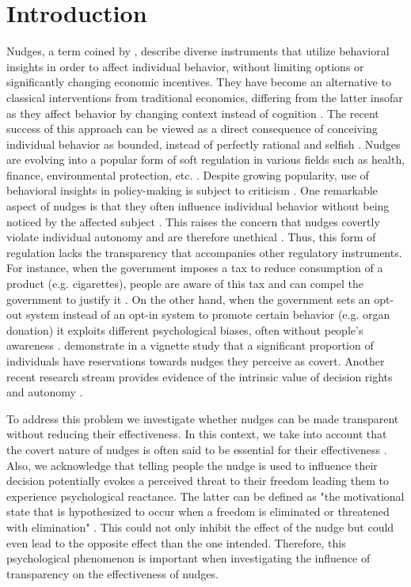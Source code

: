 \documentclass[review, authoryear,12pt]{elsarticle}
\begin{document}

\section{Introduction}
Nudges, a term coined by \cite{Thaler.2008}, describe diverse instruments that utilize behavioral insights in order to affect individual behavior, without limiting options or significantly changing economic incentives. They have become an alternative to classical interventions from traditional economics, differing from the latter insofar as they affect behavior by changing context instead of cognition \citep{Dolan.2012}. The recent success of this approach can be viewed as a direct consequence of conceiving individual behavior as bounded, instead of perfectly rational and selfish \citep{Bolton.2012}. Nudges are evolving into a popular form of soft regulation in various fields such as health, finance, environmental protection, etc. \citep{Sunstein.2014b, Alemanno.2015, WorldBank.2015, Lourenco.2016}. Despite growing popularity, use of behavioral insights in policy-making is subject to criticism \citep[e.g.][]{Hausman.2010, Rebonato.2014}. One remarkable aspect of nudges is that they often influence individual behavior without being noticed by the affected subject \citep{Dhingra.2012, Hansen.2013, Sunstein.2016}. This raises the concern that nudges covertly violate individual autonomy and are therefore unethical \citep{Bovens.2009, HouseofLordsReport.2011}. Thus, this form of regulation lacks the transparency that accompanies other regulatory instruments. For instance, when the government imposes a tax to reduce consumption of a product (e.g. cigarettes), people are aware of this tax and can compel the government to justify it \citep{Sunstein.2014c}. On the other hand, when the government sets an opt-out system instead of an opt-in system to promote certain behavior (e.g. organ donation) it exploits different psychological biases, often without people's awareness \citep{Hansen.2013}. \cite{Felsen.2013} demonstrate in a vignette study that a significant proportion of individuals have reservations towards nudges they perceive as covert. Another recent research stream provides evidence of the intrinsic value of decision rights and autonomy \citep{Fehr.2013, Bartling.2014, Owens.2014}.

To address this problem we investigate whether nudges can be made transparent without reducing their effectiveness. In this context, we take into account that the covert nature of nudges is often said to be essential for their effectiveness \citep{Bovens.2009, HouseofLordsReport.2011}. Also, we acknowledge that telling people the nudge is used to influence their decision potentially evokes a perceived threat to their freedom leading them to experience psychological reactance. The latter can be defined as "the motivational state that is hypothesized to occur when a freedom is eliminated or threatened with elimination" \citep[p. 37]{Brehm.2013}. This could not only inhibit the effect of the nudge but could even lead to the opposite effect than the one intended. Therefore, this psychological phenomenon is important when investigating the influence of transparency on the effectiveness of nudges.
\end{document}
